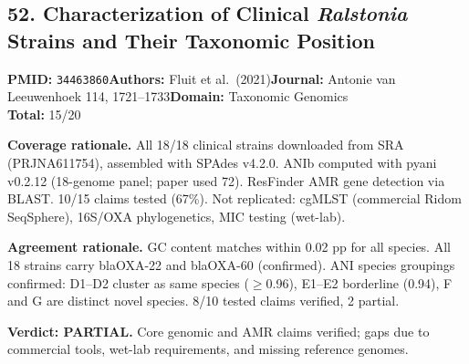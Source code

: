 \subsection{52. Characterization of Clinical \textit{Ralstonia} Strains and Their Taxonomic Position}
\textbf{PMID:} \texttt{34463860}\quad\textbf{Authors:} Fluit et al.\ (2021)\quad\textbf{Journal:} Antonie van Leeuwenhoek 114, 1721--1733\quad\textbf{Domain:} Taxonomic Genomics\\
\quad{}\quad\textbf{Total:} 15/20\par\smallskip
\noindent\textbf{Coverage rationale.} All 18/18 clinical strains downloaded from SRA (PRJNA611754), assembled with SPAdes v4.2.0. ANIb computed with pyani v0.2.12 (18-genome panel; paper used 72). ResFinder AMR gene detection via BLAST. 10/15 claims tested (67\%). Not replicated: cgMLST (commercial Ridom SeqSphere), 16S/OXA phylogenetics, MIC testing (wet-lab).\par
\noindent\textbf{Agreement rationale.} GC content matches within 0.02 pp for all species. All 18 strains carry blaOXA-22 and blaOXA-60 (confirmed). ANI species groupings confirmed: D1--D2 cluster as same species ($\geq$0.96), E1--E2 borderline (0.94), F and G are distinct novel species. 8/10 tested claims verified, 2 partial.\par\smallskip
\noindent\textbf{Verdict: PARTIAL.} Core genomic and AMR claims verified; gaps due to commercial tools, wet-lab requirements, and missing reference genomes.

